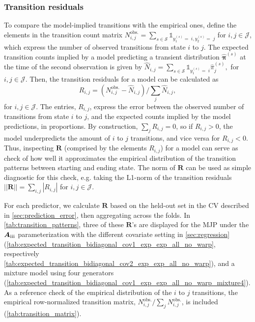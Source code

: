 \documentclass{article}
\newcommand{\RN}[1]{\textup{\uppercase\expandafter{\romannumeral#1}}}
\providecommand{\DIFaddbegin}{} %
\providecommand{\DIFaddend}{} %
\providecommand{\DIFdelbegin}{} %
\providecommand{\DIFdelend}{} %
\begin{document}
\subsubsection{Transition residuals} \label{sec:transition_patterns}

To compare the model-implied transitions with the empirical ones, define the elements in the transition count matrix
$
  N_{i,j}^{\text{obs.}} = \sum_{s \in \mathcal S} \mathds{1}_{y_1^{(s)} =\; i, y_2^{(s)} =\; j}
$ for $i,j \in \mathcal J$, which express the number of observed transitions from state $i$ to $j$. The expected transition counts implied by a model predicting a transient distribution $\widehat{\bm \pi}^{(s)}$ at the time of the second observation is given by
$
\widehat{  N}_{i,j} =  \sum_{s \in \mathcal S} \mathds{1}_{y_1^{(s)} = \; i} \widehat{ \pi}_j^{(s)},
$ for $i,j \in \mathcal J$.
Then, the transition residuals for a model can be calculated as
\DIFdelbegin %
\DIFdelend \DIFaddbegin $$
  R_{i,j} = \left(  N_{i,j}^{\text{obs.}} - \widehat{  N}_{i,j} \right) / \sum_{j}   \widehat{  N}_{i,j},
$$\DIFaddend  for $i,j \in \mathcal J$.
The entries, $  R_{i,j}$, express the error between the observed number of transitions from state $i$ to $j$, and the expected counts implied by the model predictions, in proportions. 
By construction, $\sum_{j}   R_{i,j} = 0$, so if $  R_{i,j} > 0$, the model underpredicts the amount of $i$ to $j$ transitions, and vice versa for $  R_{i,j} < 0$.
Thus, inspecting $\bm R$ (comprised by the elements $R_{i,j}$) for a model can serve as check of how well it approximates the empirical distribution of the transition patterns between starting and ending state. The norm of $\bm R$ can be used as simple diagnostic for this check, e.g. taking the L1-norm of the transition residuals
$
|| \bm R || = \sum_{i,j} |  R_{i,j}|
$ for $i,j \in \mathcal J$.

For each predictor, we calculate $\bm R$ based on the held-out set in the CV described in \cref{sec:prediction_error}, then aggregating across the folds. In \cref{tab:transition_patterns}, three of these $\bm R$'s are displayed for the MJP under the $\bm{A}_{\RN{3}}$ parameterization with the different covariate setting in \cref{sec:regression} (\cref{tab:expected_transition_bidiagonal_cov1_exp_exp_all_no_warp}, respectively \cref{tab:expected_transition_bidiagonal_cov2_exp_exp_all_no_warp}), and a mixture model using four generators (\cref{tab:expected_transition_bidiagonal_cov1_exp_exp_all_no_warp_mixture4}). As a reference check of the empirical distribution of the $i$ to $j$ transitions, the empirical row-normalized transition matrix, $ N_{i,j}^{\text{obs.}} / \sum_{j}  N_{i,j}^{\text{obs.}}$, is included (\cref{tab:transition_matrix}).
\end{document}
